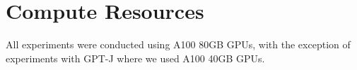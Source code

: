 \documentclass{article}
\theoremstyle{plain}
\theoremstyle{definition}
\theoremstyle{remark}
\begin{document}
\section{Compute Resources}
All experiments were conducted using A100 80GB GPUs, with the exception of experiments with GPT-J \cite{gpt-j} where we used A100 40GB GPUs.

\end{document}
